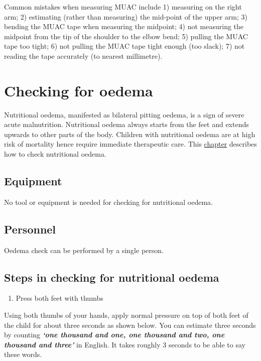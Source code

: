 \documentclass[12pt,]{book}
\providecommand{\tightlist}{%
  \setlength{\itemsep}{0pt}\setlength{\parskip}{0pt}}
\theoremstyle{definition}
\theoremstyle{definition}
\theoremstyle{definition}
\theoremstyle{remark}
\let\BeginKnitrBlock\begin \let\EndKnitrBlock\end
\begin{document}
\BeginKnitrBlock{rmdwarning}
Common mistakes when measuring MUAC include 1) measuring on the right
arm; 2) estimating (rather than measuring) the mid-point of the upper
arm; 3) bending the MUAC tape when measuring the midpoint; 4) not
measuring the midpoint from the tip of the shoulder to the elbow bend;
5) pulling the MUAC tape too tight; 6) not pulling the MUAC tape tight
enough (too slack); 7) not reading the tape accurately (to nearest
millimetre).
\EndKnitrBlock{rmdwarning}

\hypertarget{oedema}{%
\chapter{Checking for oedema}\label{oedema}}

Nutritional oedema, manifested as bilateral pitting oedema, is a sign of
severe acute malnutrition. Nutritional oedema always starts from the
feet and extends upwards to other parts of the body. Children with
nutritional oedema are at high risk of mortality hence require immediate
therapeutic care. This \protect\hyperlink{oedema}{chapter} describes how
to check nutritional oedema.

\hypertarget{equipment-3}{%
\section{Equipment}\label{equipment-3}}

No tool or equipment is needed for checking for nutritional oedema.

\hypertarget{personnel-3}{%
\section{Personnel}\label{personnel-3}}

Oedema check can be performed by a single person.

\hypertarget{steps-in-checking-for-nutritional-oedema}{%
\section{Steps in checking for nutritional
oedema}\label{steps-in-checking-for-nutritional-oedema}}

\begin{enumerate}
\def\labelenumi{\arabic{enumi}.}
\tightlist
\item
  Press both feet with thumbs
\end{enumerate}

Using both thumbs of your hands, apply normal pressure on top of both
feet of the child for about three seconds as shown below. You can
estimate three seconds by counting \textbf{\emph{`one thousand and one,
one thousand and two, one thousand and three'}} in English. It takes
roughly 3 seconds to be able to say these words.
\end{document}

